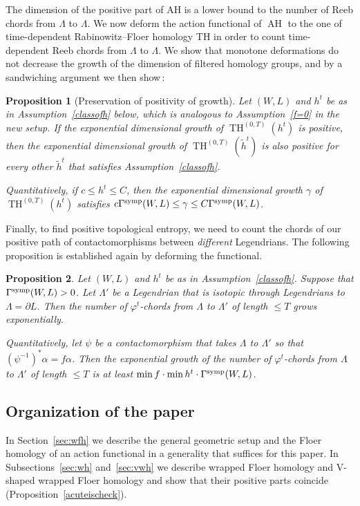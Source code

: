\documentclass{amsart}
\renewcommand{\TH}{\operatorname{TH}}
\newcommand{\AH}{\operatorname{AH}}
\newcommand{\tiilde}{\widetilde}
\newtheorem{proposition}{Proposition}[section]
\theoremstyle{definition}
\theoremstyle{remark}
\numberwithin{equation}{section}
\begin{document}
The dimension of the positive part of AH is a lower bound to the number of Reeb chords from $\Lambda$ to $\Lambda$. We now deform the action functional of $\AH$ to the one of time-dependent Rabinowitz--Floer homology TH in order to count time-dependent Reeb chords from $\Lambda$ to $\Lambda$. We show that monotone deformations do not decrease the growth of the dimension of filtered homology groups, and by a sandwiching argument we then show\,:

\begin{proposition}[Preservation of positivity of growth]\label{continuation}
	Let $(W,L)$ and $h^t$ be as in Assumption~\ref{classofh} below, which is analogous to Assumption~\ref{f=0} in the new setup. 
	If the exponential dimensional growth of $\TH^{(0,T)}(h^t)$ is positive, then the exponential dimensional growth of $\TH^{(0,T)}(\tiilde h^t)$ is also positive for every other $\tiilde h^t$ that satisfies Assumption~\ref{classofh}.
	
	Quantitatively, if $c\leq h^t\leq C$, then the exponential dimensional growth $\gamma$ of $\TH^{(0,T)}(h^t)$ satisfies $c\Gamma^{\rm symp}(W,L)\leq \gamma\leq C\Gamma^{\rm symp}(W,L)$.
\end{proposition}	

Finally, to find positive topological entropy, we need to count the chords of our positive path of contactomorphisms between {\it different} Legendrians. The following proposition is established again by deforming the functional.

\begin{proposition}\label{changeLegendrian}
	Let $(W,L)$ and $h^t$ be as in Assumption~\ref{classofh}. Suppose that $\Gamma^{\rm symp}(W,L)>0$. Let $\Lambda'$ be a Legendrian that is isotopic through Legendrians to $\Lambda=\partial L$. Then the number of $\varphi^t$-chords from $\Lambda$ to $\Lambda'$ of length $\leq T$ grows exponentially. 
	
	Quantitatively, let $\psi$ be a contactomorphism that takes $\Lambda$ to $\Lambda'$ so that $(\psi^{-1})^*\alpha=f\alpha$. Then the exponential growth of the number of $\varphi^t$-chords from $\Lambda$ to $\Lambda'$ of length $\leq T$ is at least $\min f \cdot\min h^t\cdot\Gamma^{\rm symp}(W,L)$.
\end{proposition}

\subsection*{Organization of the paper} 
	In Section~\ref{sec:wfh} we describe the general geometric setup and the Floer homology of an action functional in a generality that suffices for this paper. In Subsections~\ref{sec:wh} and~\ref{sec:vwh} we describe wrapped Floer homology and V-shaped wrapped Floer homology and show that their positive parts coincide (Proposition~\ref{acuteischeck}). 
	
\end{document}
